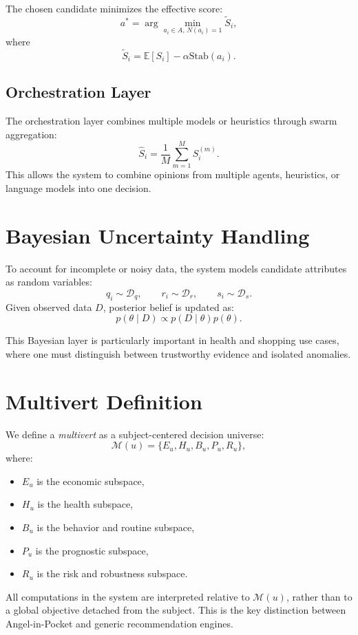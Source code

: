 \documentclass[11pt,a4paper]{article}
\begin{document}
The chosen candidate minimizes the effective score:
\[
a^* = \arg\min_{a_i \in A,\, N(a_i)=1} \tilde{S}_i,
\]
where
\[
\tilde{S}_i = \mathbb{E}[S_i] - \alpha \mathrm{Stab}(a_i).
\]

\subsection{Orchestration Layer}
The orchestration layer combines multiple models or heuristics through swarm aggregation:
\[
\hat{S}_i = \frac{1}{M} \sum_{m=1}^{M} S_i^{(m)}.
\]
This allows the system to combine opinions from multiple agents, heuristics, or language models into one decision.

\section{Bayesian Uncertainty Handling}

To account for incomplete or noisy data, the system models candidate attributes as random variables:
\[
q_i \sim \mathcal{D}_q, \qquad r_i \sim \mathcal{D}_r, \qquad s_i \sim \mathcal{D}_s.
\]
Given observed data $D$, posterior belief is updated as:
\[
p(\theta \mid D) \propto p(D \mid \theta)p(\theta).
\]

This Bayesian layer is particularly important in health and shopping use cases, where one must distinguish between trustworthy evidence and isolated anomalies.

\section{Multivert Definition}

We define a \emph{multivert} as a subject-centered decision universe:
\[
\mathcal{M}(u) = \{E_u, H_u, B_u, P_u, R_u\},
\]
where:
\begin{itemize}[leftmargin=1.2em]
    \item $E_u$ is the economic subspace,
    \item $H_u$ is the health subspace,
    \item $B_u$ is the behavior and routine subspace,
    \item $P_u$ is the prognostic subspace,
    \item $R_u$ is the risk and robustness subspace.
\end{itemize}

All computations in the system are interpreted relative to $\mathcal{M}(u)$, rather than to a global objective detached from the subject. This is the key distinction between Angel-in-Pocket and generic recommendation engines.
\end{document}
